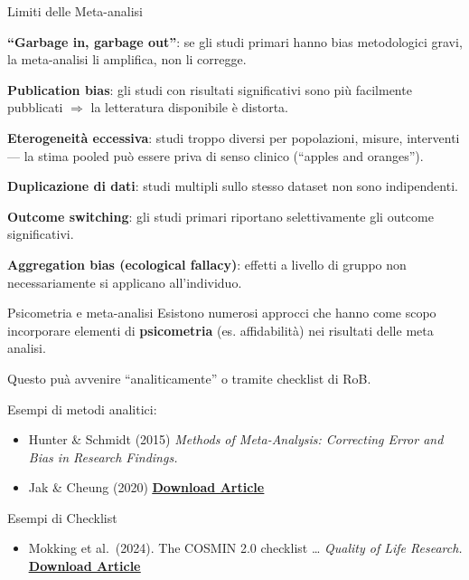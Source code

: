 \documentclass[
  ignorenonframetext,
]{beamer}
\providecommand{\tightlist}{%
  \setlength{\itemsep}{0pt}\setlength{\parskip}{0pt}}
\begin{document}
\begin{frame}{Limiti delle Meta-analisi}
\label{limiti-delle-meta-analisi}
\small

\textbf{``Garbage in, garbage out''}: se gli studi primari hanno bias
metodologici gravi, la meta-analisi li amplifica, non li corregge.

\vspace{0.3em}

\textbf{Publication bias}: gli studi con risultati significativi sono
più facilmente pubblicati \(\Rightarrow\) la letteratura disponibile è
distorta.

\vspace{0.3em}

\textbf{Eterogeneità eccessiva}: studi troppo diversi per popolazioni,
misure, interventi --- la stima pooled può essere priva di senso clinico
(``apples and oranges'').

\vspace{0.3em}

\textbf{Duplicazione di dati}: studi multipli sullo stesso dataset non
sono indipendenti.

\vspace{0.3em}

\textbf{Outcome switching}: gli studi primari riportano selettivamente
gli outcome significativi.

\vspace{0.3em}

\textbf{Aggregation bias (ecological fallacy)}: effetti a livello di
gruppo non necessariamente si applicano all'individuo.
\end{frame}

\begin{frame}{Psicometria e meta-analisi}
\label{psicometria-e-meta-analisi}
Esistono numerosi approcci che hanno come scopo incorporare elementi di
\textbf{psicometria} (es. affidabilità) nei risultati delle meta
analisi.

Questo puà avvenire ``analiticamente'' o tramite checklist di RoB.

Esempi di metodi analitici:

\begin{itemize}
\item
  Hunter \& Schmidt (2015) \emph{Methods of Meta-Analysis: Correcting
  Error and Bias in Research Findings.}
\item
  Jak \& Cheung (2020)
  \href{https://files.osf.io/v1/resources/ce85j/providers/osfstorage/5bf7eb3ec21cd8001aa31ac9?action=download&version=4&direct}{\underline{\textbf{Download Article}}}
\end{itemize}

Esempi di Checklist

\begin{itemize}
\tightlist
\item
  Mokking et al.~(2024). The COSMIN 2.0 checklist \ldots{} \emph{Quality
  of Life Research.}
  \href{https://pmc.ncbi.nlm.nih.gov/articles/PMC11541334/pdf/11136_2024_Article_3761.pdf}{\underline{\textbf{Download Article}}}
\end{itemize}
\end{frame}
\end{document}
